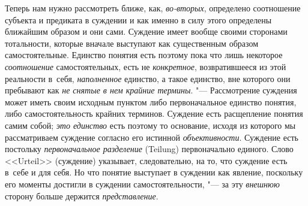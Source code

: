 Теперь нам нужно рассмотреть ближе, как, {\em во-вторых},
определено соотношение субъекта и предиката в суждении и как
именно в силу этого определены ближайшим образом и они сами. Суждение имеет
вообще своими сторонами тотальности, которые вначале выступают как
существенным образом самостоятельные. Единство понятия есть поэтому пока
что лишь некоторое {\em соотношение} самостоятельных, есть не
{\em конкретное}, возвратившееся из этой реальности в~себя, {\em наполненное}
единство, а такое единство, вне которого они пребывают как {\em не снятые
в нем крайние термины}. "--- Рассмотрение суждения может иметь своим
исходным пунктом либо первоначальное единство понятия, либо
самостоятельность крайних терминов. Суждение есть расщепление понятия самим
собой; {\em это единство} есть поэтому то основание, исходя из которого мы
рассматриваем суждение согласно его истинной {\em объективности}.
Суждение есть постольку {\em первоначальное разделение}
(Teilung) первоначально единого. Слово <<Urteil>> (суждение)
указывает, следовательно, на то, что суждение есть в~себе и для себя. Но
что понятие выступает в суждении как явление, поскольку его моменты
достигли в суждении самостоятельности, "--- за эту {\em внешнюю} сторону
больше держится {\em представление}.

